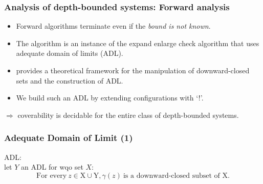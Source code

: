 \documentclass{beamer}
\begin{document}
\begin{frame}
  \frametitle{Analysis of depth-bounded systems: Forward analysis}

  \begin{itemize}
  \item Forward algorithms terminate even if the \emph{bound is not known}.
  \item The algorithm is an instance of the expand enlarge check algorithm \cite{GeeraertsETAL06ExpandEnlargeCheck} that uses \alert{adequate domain of limits} (ADL).
  \item \cite{FinkelGoubaultLarrecq09ForwardAnalysisForWSTS} provides a theoretical framework for the manipulation of downward-closed sets and the construction of ADL.
  \item We build such an ADL by extending configurations with `!'.
  \end{itemize}

  \vspace{10pt}

  $\Rightarrow$ coverability is decidable for the entire class of depth-bounded systems.
\end{frame}


\begin{frame}
  \frametitle{Adequate Domain of Limit (1)}
  ADL: \cite{GeeraertsETAL06ExpandEnlargeCheck}\\
  let $Y$ an ADL for wqo set $X$:
  \[\text{For every} ~ z \in \text{X} \cup \text{Y}, \gamma(z) ~ \text{is a downward-closed subset of X}.\]

  \begin{center}
  \end{center}
\end{frame}
\end{document}
